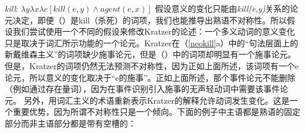 \ea 
\emph{kill}: $\lambda y\lambda x\lambda e[kill(e,y) \wedge agent(e, x)]$ 
\z
假设意义的变化只能由\emph{kill(e,y)}关系的论元决定，即便（）是kill（杀死）的词项，我们也能推导出熟语不对称性。所以假设我们尝试使用一个不同的假设来修改Kratzer的论述：一个多义动词的意义变化只是取决于词汇所示功能的一个论元。Kratzer在（\ref{neokill}a）中的“句法层面上的新戴维森主义”的词项缺少施事论元，但是（）中的词项却明显有一个施事论元。但是，Kratzer的词项仍然无法预测不对称性，因为正如上面所述，该词项有一个e论元，所以意义的变化取决于“e的施事”。正如上面所述，那个事件论元不能删除（例如通过存在量词），因为在事件识别引入施事的无声轻动词中需要该事件论元\citep[]{Kratzer96a}。
    另外，用词汇主义的术语重新表示Kratzer的解释允许动词发生变化。这是一个重要优势，因为所谓不对称性只是一个倾向。下面的例子中主语都是熟语的固定部分而非主语部分都是带有空槽的：

